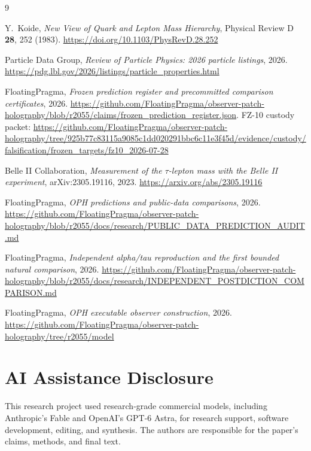 \documentclass[11pt]{article}
\theoremstyle{remark}
\begin{document}
\begin{thebibliography}{9}

Y.~Koide,
\emph{New View of Quark and Lepton Mass Hierarchy},
Physical Review D \textbf{28}, 252 (1983).
\url{https://doi.org/10.1103/PhysRevD.28.252}

Particle Data Group,
\emph{Review of Particle Physics: 2026 particle listings},
2026.
\url{https://pdg.lbl.gov/2026/listings/particle_properties.html}

FloatingPragma,
\emph{Frozen prediction register and precommitted comparison
certificates},
2026.
\url{https://github.com/FloatingPragma/observer-patch-holography/blob/r2055/claims/frozen_prediction_register.json}.
FZ-10 custody packet:
\url{https://github.com/FloatingPragma/observer-patch-holography/tree/925b77c83115a9085c1dd020291bbc6c11e3f45d/evidence/custody/falsification/frozen_targets/fz10_2026-07-28}

Belle II Collaboration,
\emph{Measurement of the \(\tau\)-lepton mass with the Belle II experiment},
arXiv:2305.19116, 2023.
\url{https://arxiv.org/abs/2305.19116}

FloatingPragma,
\emph{OPH predictions and public-data comparisons}, 2026.
\url{https://github.com/FloatingPragma/observer-patch-holography/blob/r2055/docs/research/PUBLIC_DATA_PREDICTION_AUDIT.md}

FloatingPragma,
\emph{Independent alpha/tau reproduction and the first bounded natural comparison}, 2026.
\url{https://github.com/FloatingPragma/observer-patch-holography/blob/r2055/docs/research/INDEPENDENT_POSTDICTION_COMPARISON.md}

FloatingPragma,
\emph{OPH executable observer construction}, 2026.
\url{https://github.com/FloatingPragma/observer-patch-holography/tree/r2055/model}

\end{thebibliography}

\section*{AI Assistance Disclosure}
This research project used research-grade commercial models, including
Anthropic's Fable and OpenAI's GPT-6 Astra, for research support, software
development, editing, and synthesis. The authors are responsible for the
paper's claims, methods, and final text.
\end{document}
